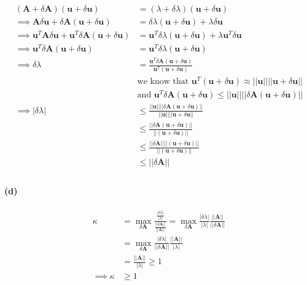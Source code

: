 \documentclass[12pt, letterpaper]{article}
\begin{document}
\begin{align*}
  (\mathbf{A} + \delta \mathbf{A})(\mathbf{u} + \delta \mathbf{u})
  &= (\lambda + \delta \lambda)(\mathbf{u} + \delta\mathbf{u}) \\
  \implies \mathbf{A}\delta \mathbf{u} + \delta \mathbf{A}(\mathbf{u} + \delta \mathbf{u})
  &= \delta \lambda(\mathbf{u} + \delta \mathbf{u}) + \lambda \delta \mathbf{u} \\
  \implies \mathbf{u}^T\mathbf{A}\delta\mathbf{u}
  + \mathbf{u}^T\delta \mathbf{A}(\mathbf{u} + \delta \mathbf{u})
  &= \mathbf{u}^T\delta \lambda (\mathbf{u} + \delta \mathbf{u})
  + \lambda \mathbf{u}^T \delta \mathbf{u} \\
  \implies \mathbf{u}^T\delta \mathbf{A}(\mathbf{u} + \delta \mathbf{u})
  &= \mathbf{u}^T\delta\lambda(\mathbf{u} + \delta \mathbf{u}) \\
  \implies \delta\lambda &= \frac{\mathbf{u}^T\delta \mathbf{A}(\mathbf{u} + \delta \mathbf{u})}{\mathbf{u}^T(\mathbf{u} + \delta \mathbf{u})} \\
  &\text{we know that $\mathbf{u}^T(\mathbf{u} + \delta \mathbf{u}) \approx ||\mathbf{u}||||\mathbf{u} + \delta \mathbf{u}||$} \\
  &\text{and $\mathbf{u}^T\delta \mathbf{A}(\mathbf{u} + \delta \mathbf{u})
    \leq ||\mathbf{u}||||\delta \mathbf{A}(\mathbf{u} + \delta \mathbf{u})||$} \\
  \implies |\delta \lambda| &\leq \frac{||\mathbf{u}||||\delta \mathbf{A}(\mathbf{u} + \delta \mathbf{u})||}{||\mathbf{u}||||\mathbf{u} + \delta \mathbf{u}||} \\
  &\leq \frac{||\delta \mathbf{A}(\mathbf{u} + \delta \mathbf{u})||}{||(\mathbf{u} + \delta \mathbf{u})||} \\
  &\leq \frac{||\delta \mathbf{A}||||(\mathbf{u} + \delta \mathbf{u})||}{||(\mathbf{u} + \delta \mathbf{u})||} \\
  &\leq ||\delta \mathbf{A}|| \\
\end{align*}

\paragraph{(d)}
\begin{align*}
  \kappa &= \max_{\delta \mathbf{A}} \frac{\frac{|\delta \lambda|}{|\lambda|}}{\frac{||\delta \mathbf{A}||}{||\mathbf{A}||}}
  = \max_{\delta \mathbf{A}} \frac{|\delta \lambda|}{|\lambda|}\frac{||\mathbf{A}||}{||\delta \mathbf{A}||} \\
  &= \max_{\delta \mathbf{A}} \frac{|\delta \lambda|}{||\delta \mathbf{A}||}\frac{||\mathbf{A}||}{|\lambda|} \\
  &= \frac{||\mathbf{A}||}{|\lambda|} \geq 1\\
  \implies \kappa &\geq 1 \\
\end{align*}
\end{document}
